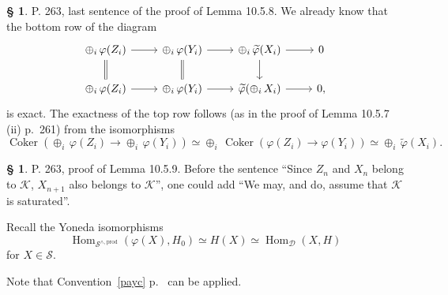 \documentclass[12pt]{article}
\theoremstyle{remark}
\theoremstyle{definition}
\newtheorem{s}[thm]{\S}
\newcommand{\cc}{\mathcal}
\DeclareMathOperator{\Coker}{Coker}
\DeclareMathOperator{\Hom}{Hom}%
\begin{document}
\begin{s} P. 263, last sentence of the proof of Lemma 10.5.8. We already know that the bottom row of the diagram 
$$
\begin{tikzcd}
\oplus_i\,\varphi(Z_i)\ar[equal]{d}\ar{r}&\oplus_i\,\varphi(Y_i)\ar[equal]{d}\ar{r}&\oplus_i\,\widetilde\varphi(X_i)\ar{d}\ar{r}&0\\ 
\oplus_i\,\varphi(Z_i)\ar{r}&\oplus_i\,\varphi(Y_i)\ar{r}&\widetilde\varphi(\oplus_i\,X_i)\ar{r}&0,
\end{tikzcd}
$$ 
is exact. The exactness of the top row follows (as in the proof of Lemma 10.5.7 (ii) p.~261) from the isomorphisms 
$$
\Coker(\oplus_i\,\varphi(Z_i)\to\oplus_i\,\varphi(Y_i))\simeq\oplus_i\,\Coker(\varphi(Z_i)\to\varphi(Y_i))\simeq\oplus_i\,\widetilde\varphi(X_i).
$$
\end{s}
%
%
\begin{s} P. 263, proof of Lemma 10.5.9. Before the sentence ``Since $Z_n$ and $X_n$ belong to $\cc K$, $X_{n+1}$ also belongs to $\cc K$'', one could add ``We may, and do, assume that $\cc K$ is saturated''.

Recall the Yoneda isomorphisms 
$$
\Hom_{\cc S^{\wedge,\text{prod}}}(\varphi(X),H_0)\simeq H(X)\simeq\Hom_{\cc D}(X,H)
$$ 
for $X\in\cc S$.

Note that Convention~\ref{payc} p.~\pageref{payc} can be applied.
\end{s}
%
%
\end{document}

